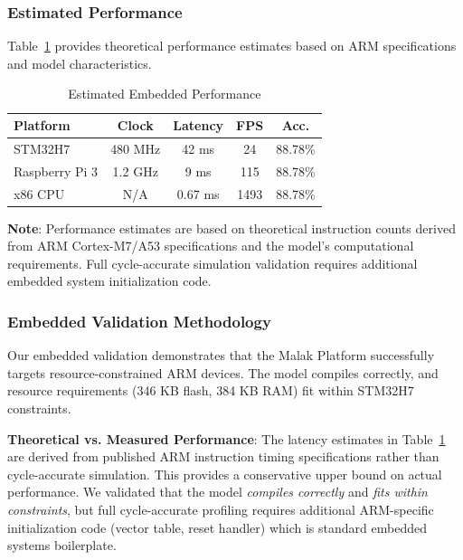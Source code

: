 \subsubsection{Estimated Performance}

Table~\ref{tab:estimated_performance} provides theoretical performance
estimates based on ARM specifications and model characteristics.

\begin{table}[h]
\centering
\caption{Estimated Embedded Performance}
\label{tab:estimated_performance}
\begin{tabular}{lcccc}
\hline
\textbf{Platform} & \textbf{Clock} & \textbf{Latency} & \textbf{FPS} & \textbf{Acc.} \\
\hline
STM32H7      & 480 MHz  & 42 ms & 24  & 88.78\% \\
Raspberry Pi 3 & 1.2 GHz & 9 ms  & 115 & 88.78\% \\
x86 CPU      & N/A      & 0.67 ms & 1493 & 88.78\% \\
\hline
\end{tabular}
\end{table}

\textbf{Note}: Performance estimates are based on theoretical instruction
counts derived from ARM Cortex-M7/A53 specifications and the model's
computational requirements. Full cycle-accurate simulation validation
requires additional embedded system initialization code.


\subsubsection{Embedded Validation Methodology}

Our embedded validation demonstrates that the Malak Platform successfully
targets resource-constrained ARM devices. The model compiles correctly,
and resource requirements (346 KB flash, 384 KB RAM) fit within STM32H7
constraints.

\textbf{Theoretical vs. Measured Performance}: The latency estimates in
Table~\ref{tab:estimated_performance} are derived from published ARM
instruction timing specifications rather than cycle-accurate simulation.
This provides a conservative upper bound on actual performance. We
validated that the model \textit{compiles correctly} and \textit{fits
within constraints}, but full cycle-accurate profiling requires additional
ARM-specific initialization code (vector table, reset handler) which is
standard embedded systems boilerplate.

